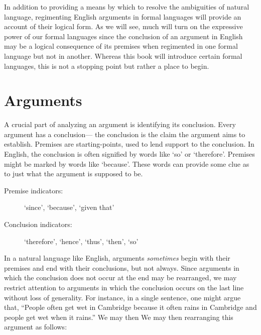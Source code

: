 In addition to providing a means by which to resolve the ambiguities of natural language, regimenting English arguments in formal languages will provide an account of their logical form.
As we will see, much will turn on the expressive power of our formal languages since the conclusion of an argument in English may be a logical consequence of its premises when regimented in one formal language but not in another.
Whereas this book will introduce certain formal languages, this is not a stopping point but rather a place to begin.






\section{Arguments}

A crucial part of analyzing an argument is identifying its conclusion.
Every argument has a conclusion--- the conclusion is the claim the argument aims to establish.
Premises are starting-points, used to lend support to the conclusion.
In English, the conclusion is often signified by words like `so' or `therefore'.
Premises might be marked by words like `because'.
These words can provide some clue as to just what the argument is supposed to be.

\begin{description}
  \item[Premise indicators:] `since', `because', `given that'
  \item[Conclusion indicators:] `therefore', `hence', `thus', `then', `so'
\end{description}

In a natural language like English, arguments \textit{sometimes} begin with their premises and end with their conclusions, but not always.
Since arguments in which the conclusion does not occur at the end may be rearranged, we may restrict attention to arguments in which the conclusion occurs on the last line without loss of generality.
For instance, in a single sentence, one might argue that, ``People often get wet in Cambridge because it often rains in Cambridge and people get wet when it rains.''
We may then We may then rearranging this argument as follows:

